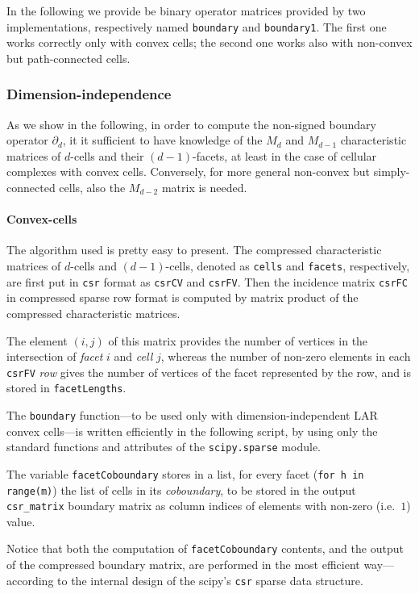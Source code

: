 \documentclass[11pt,oneside]{article}	%
\begin{document}
In the following we provide be binary operator matrices provided by two implementations,
respectively named \texttt{boundary} and \texttt{boundary1}. The first one works correctly only with convex cells; the second one works also with non-convex but path-connected cells.


\subsubsection{Dimension-independence}

As we show in the following, in order to compute the non-signed boundary operator $\partial_d$, it it sufficient to have knowledge of the $M_d$ and $M_{d-1}$ characteristic matrices of $d$-cells and their $(d-1)$-facets, at least in the case of cellular complexes with convex cells. Conversely, for more general non-convex but simply-connected cells, also the $M_{d-2}$ matrix is needed.

\paragraph{Convex-cells}

The algorithm used is pretty easy to present. The compressed characteristic matrices of $d$-cells and $(d-1)$-cells, denoted as \texttt{cells} and \texttt{facets}, respectively, are first put in \texttt{csr} format as \texttt{csrCV} and \texttt{csrFV}. Then the incidence matrix \texttt{csrFC} in compressed sparse row format is computed by matrix product of the compressed characteristic matrices. 

The element $(i,j)$ of this matrix provides the number of vertices in the intersection of \emph{facet} $i$ and \emph{cell} $j$, whereas the number of non-zero elements in each \texttt{csrFV} \emph{row} gives the number of vertices of the facet represented by the row, and is stored in \texttt{facetLengths}. 

The \texttt{boundary} function---to be used only with dimension-independent LAR convex cells---is written efficiently in the following script, by using only the standard functions and attributes of the \texttt{scipy.sparse} module.

The variable \texttt{facetCoboundary} stores in a list, for every facet (\texttt{for h in range(m)})
the list of cells in its \emph{coboundary}, to be stored in the output \texttt{csr\_matrix} boundary matrix as column indices of elements with non-zero (i.e.~$1$) value.

Notice that both the computation of \texttt{facetCoboundary} contents, and the output of the compressed boundary matrix, are performed in the most efficient way---according to the internal design of the scipy's \texttt{csr} sparse data structure.
\end{document}
